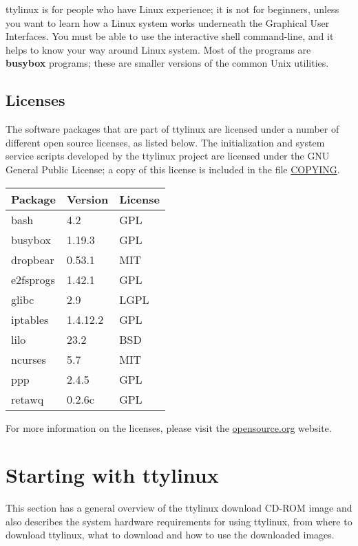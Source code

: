 \documentclass[10pt]{article}
\begin{document}
ttylinux is for people who have Linux experience; it is not for beginners,
unless you want to learn how a Linux system works underneath the Graphical User
Interfaces. You must be able to use the interactive shell command-line, and it
helps to know your way around Linux system. Most of the programs are
{\bf busybox} programs; these are smaller versions of the common Unix utilities.

\subsection{Licenses}

The software packages that are part of ttylinux are licensed under a number of
different open source licenses, as listed below. The initialization and system
service scripts developed by the ttylinux project are licensed under the GNU
General Public License; a copy of this license is included in the file
\url{COPYING}.

\begin{center}
\begin{tabular}{l|l|l}
Package      & Version & License \\
\hline
bash         & 4.2      & GPL  \\
busybox      & 1.19.3   & GPL  \\
dropbear     & 0.53.1   & MIT  \\
e2fsprogs    & 1.42.1   & GPL  \\
glibc        & 2.9      & LGPL \\
iptables     & 1.4.12.2 & GPL  \\
lilo         & 23.2     & BSD  \\
ncurses      & 5.7      & MIT  \\
ppp          & 2.4.5    & GPL  \\
retawq       & 0.2.6c   & GPL  \\
\end{tabular}
\end{center}

For more information on the licenses, please visit the \url{opensource.org}
website.

\newpage
\section{Starting with ttylinux}

This section has a general overview of the ttylinux download CD-ROM image and
also describes the system hardware requirements for using ttylinux, from where
to download ttylinux, what to download and how to use the downloaded images.
\end{document}
